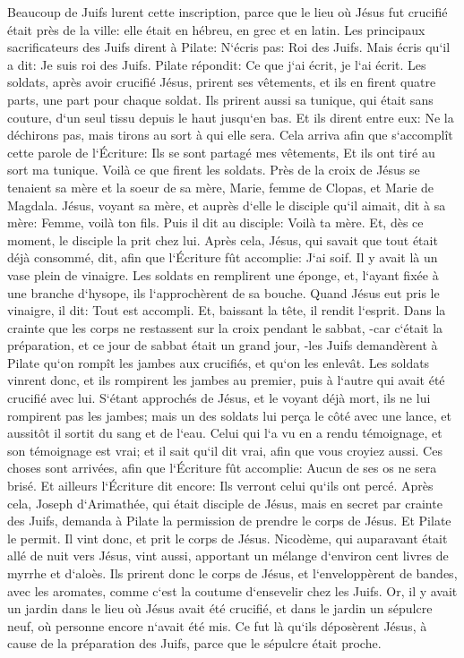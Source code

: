 \verse Beaucoup de Juifs lurent cette inscription, parce que le lieu où Jésus fut crucifié était près de la ville: elle était en hébreu, en grec et en latin. 
\verse Les principaux sacrificateurs des Juifs dirent à Pilate: N`écris pas: Roi des Juifs. Mais écris qu`il a dit: Je suis roi des Juifs. 
\verse Pilate répondit: Ce que j`ai écrit, je l`ai écrit. 
\verse Les soldats, après avoir crucifié Jésus, prirent ses vêtements, et ils en firent quatre parts, une part pour chaque soldat. Ils prirent aussi sa tunique, qui était sans couture, d`un seul tissu depuis le haut jusqu`en bas. Et ils dirent entre eux: 
\verse Ne la déchirons pas, mais tirons au sort à qui elle sera. Cela arriva afin que s`accomplît cette parole de l`Écriture: Ils se sont partagé mes vêtements, Et ils ont tiré au sort ma tunique. Voilà ce que firent les soldats. 
\verse Près de la croix de Jésus se tenaient sa mère et la soeur de sa mère, Marie, femme de Clopas, et Marie de Magdala. 
\verse Jésus, voyant sa mère, et auprès d`elle le disciple qu`il aimait, dit à sa mère: Femme, voilà ton fils. 
\verse Puis il dit au disciple: Voilà ta mère. Et, dès ce moment, le disciple la prit chez lui. 
\verse Après cela, Jésus, qui savait que tout était déjà consommé, dit, afin que l`Écriture fût accomplie: J`ai soif. 
\verse Il y avait là un vase plein de vinaigre. Les soldats en remplirent une éponge, et, l`ayant fixée à une branche d`hysope, ils l`approchèrent de sa bouche. 
\verse Quand Jésus eut pris le vinaigre, il dit: Tout est accompli. Et, baissant la tête, il rendit l`esprit. 
\verse Dans la crainte que les corps ne restassent sur la croix pendant le sabbat, -car c`était la préparation, et ce jour de sabbat était un grand jour, -les Juifs demandèrent à Pilate qu`on rompît les jambes aux crucifiés, et qu`on les enlevât. 
\verse Les soldats vinrent donc, et ils rompirent les jambes au premier, puis à l`autre qui avait été crucifié avec lui. 
\verse S`étant approchés de Jésus, et le voyant déjà mort, ils ne lui rompirent pas les jambes; 
\verse mais un des soldats lui perça le côté avec une lance, et aussitôt il sortit du sang et de l`eau. 
\verse Celui qui l`a vu en a rendu témoignage, et son témoignage est vrai; et il sait qu`il dit vrai, afin que vous croyiez aussi. 
\verse Ces choses sont arrivées, afin que l`Écriture fût accomplie: Aucun de ses os ne sera brisé. 
\verse Et ailleurs l`Écriture dit encore: Ils verront celui qu`ils ont percé. 
\verse Après cela, Joseph d`Arimathée, qui était disciple de Jésus, mais en secret par crainte des Juifs, demanda à Pilate la permission de prendre le corps de Jésus. Et Pilate le permit. Il vint donc, et prit le corps de Jésus. 
\verse Nicodème, qui auparavant était allé de nuit vers Jésus, vint aussi, apportant un mélange d`environ cent livres de myrrhe et d`aloès. 
\verse Ils prirent donc le corps de Jésus, et l`enveloppèrent de bandes, avec les aromates, comme c`est la coutume d`ensevelir chez les Juifs. 
\verse Or, il y avait un jardin dans le lieu où Jésus avait été crucifié, et dans le jardin un sépulcre neuf, où personne encore n`avait été mis. 
\verse Ce fut là qu`ils déposèrent Jésus, à cause de la préparation des Juifs, parce que le sépulcre était proche. 

